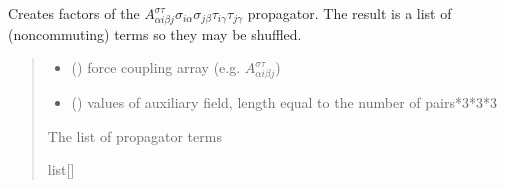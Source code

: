 \documentclass[letterpaper,10pt,english]{sphinxmanual}
\begin{document}
\begin{fulllineitems}
\begin{fulllineitems}
\label{\detokenize{spinbox:spinbox.core.HilbertPropagatorHS.factors_sigmatau}}
\pysigstartsignatures
{}
\pysigstopsignatures
\sphinxAtStartPar
Creates factors of the \(A^{\sigma\tau}_{\alpha i \beta j} \sigma_{i \alpha} \sigma_{j \beta}\tau_{i\gamma}\tau_{j\gamma}\) propagator. 
The result is a list of (noncommuting) terms so they may be shuffled.
\begin{quote}\begin{description}
\begin{itemize}
\item {} 
\sphinxAtStartPar
{} ({\hyperref[\detokenize{spinbox:spinbox.core.Coupling}]{}}) \textendash{} force coupling array (e.g. \(A^{\sigma\tau}_{\alpha i \beta j}\))

\item {} 
\sphinxAtStartPar
{} () \textendash{} values of auxiliary field, length equal to the number of pairs*3*3*3

\end{itemize}

\sphinxAtStartPar
The list of propagator terms

\sphinxAtStartPar
list{[}{\hyperref[\detokenize{spinbox:spinbox.core.HilbertOperator}]{}}{]}

\end{description}\end{quote}

\end{fulllineitems}



\end{fulllineitems}
\end{document}
